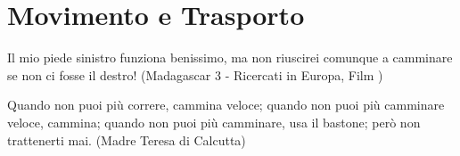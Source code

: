 \section{Movimento e Trasporto}\label{movimentocap}

\label{movimento-e-trasporto}

\begin{changemargin}{0.3cm}{0.3cm}\begin{enfasi}{
Il mio piede sinistro funziona benissimo, ma non riuscirei comunque a camminare se non ci fosse il destro! (Madagascar 3 - Ricercati in Europa, Film )

\medskip

Quando non puoi più correre, cammina veloce; quando non puoi più camminare veloce, cammina; quando non puoi più camminare, usa il bastone; però non trattenerti mai. (Madre Teresa di Calcutta)}
\end{enfasi}\end{changemargin}\medskip

